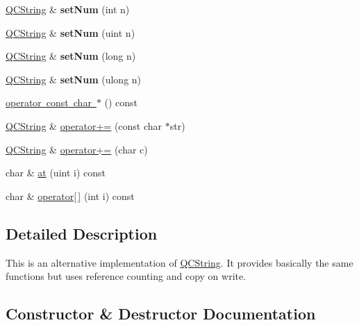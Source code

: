\begin{DoxyCompactItemize}
\mbox{\hyperlink{class_q_c_string}{Q\+C\+String}} \& {\bfseries set\+Num} (int n)
\item 
\mbox{\label{class_q_c_string_ac5b0c4579e3b07fcaad843477941cacd}} 
\mbox{\hyperlink{class_q_c_string}{Q\+C\+String}} \& {\bfseries set\+Num} (uint n)
\item 
\mbox{\label{class_q_c_string_a258a420449cd4af46dca39fc4d5966ee}} 
\mbox{\hyperlink{class_q_c_string}{Q\+C\+String}} \& {\bfseries set\+Num} (long n)
\item 
\mbox{\label{class_q_c_string_a4ca37c090965c69bdc470a7f94a45b69}} 
\mbox{\hyperlink{class_q_c_string}{Q\+C\+String}} \& {\bfseries set\+Num} (ulong n)
\item 
\mbox{\hyperlink{class_q_c_string_adf09db1887736ab6432cf0fff1cd9aec}{operator const char $\ast$}} () const
\item 
\mbox{\hyperlink{class_q_c_string}{Q\+C\+String}} \& \mbox{\hyperlink{class_q_c_string_a2ebe64838cf88c7206b76c3c431d0adc}{operator+=}} (const char $\ast$str)
\item 
\mbox{\hyperlink{class_q_c_string}{Q\+C\+String}} \& \mbox{\hyperlink{class_q_c_string_a62d09e50a2a9ea29e7dfc5eb98f8d837}{operator+=}} (char c)
\item 
char \& \mbox{\hyperlink{class_q_c_string_a3917c144e26bc525d588c1dff602be00}{at}} (uint i) const
\item 
char \& \mbox{\hyperlink{class_q_c_string_a095b0b79476f7a92b63e10d7880b4e83}{operator\mbox{[}$\,$\mbox{]}}} (int i) const
\end{DoxyCompactItemize}


\subsection{Detailed Description}
This is an alternative implementation of \mbox{\hyperlink{class_q_c_string}{Q\+C\+String}}. It provides basically the same functions but uses reference counting and copy on write. 

\subsection{Constructor \& Destructor Documentation}
\mbox{\label{class_q_c_string_ac81b67245a4667f5f257e75b2f99e278}} 
